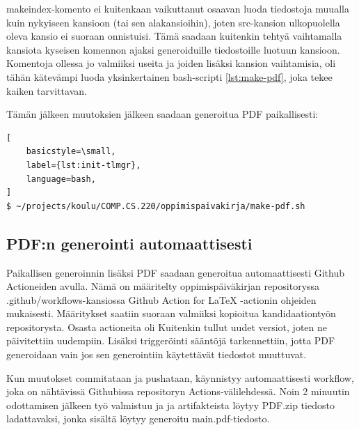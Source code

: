 makeindex-komento ei kuitenkaan vaikuttanut osaavan luoda tiedostoja muualla
kuin nykyiseen kansioon (tai sen alakansioihin), joten src-kansion ulkopuolella
oleva kansio ei suoraan onnistuisi. Tämä saadaan kuitenkin tehtyä vaihtamalla
kansiota kyseisen komennon ajaksi generoiduille tiedostoille luotuun kansioon.
Komentoja ollessa jo valmiiksi useita ja joiden lisäksi kansion vaihtamisia,
oli tähän kätevämpi luoda yksinkertainen bash-scripti \ref{lst:make-pdf}, joka
tekee kaiken tarvittavan.



Tämän jälkeen muutoksien jälkeen saadaan generoitua PDF paikallisesti:

\begin{lstlisting}[
    basicstyle=\small,
    label={lst:init-tlmgr},
    language=bash,
]
$ ~/projects/koulu/COMP.CS.220/oppimispaivakirja/make-pdf.sh
\end{lstlisting}

\subsection{PDF:n generointi automaattisesti}

Paikallisen generoinnin lisäksi PDF saadaan generoitua automaattisesti Github
Actioneiden avulla. Nämä on määritelty oppimispäiväkirjan repositoryssa
.github/workflows-kansiossa Github Action for LaTeX -actionin ohjeiden
\parencite{GithubActionsForLaTeX} mukaisesti. Määritykset saatiin suoraan
valmiiksi kopioitua kandidaationtyön repositorysta. Osasta actioneita oli
Kuitenkin tullut uudet versiot, joten ne päivitettiin uudempiin. Lisäksi
triggeröinti sääntöjä tarkennettiin, jotta PDF generoidaan vain jos sen
generointiin käytettävät tiedostot muuttuvat.

Kun muutokset commitataan ja pushataan, käynnistyy automaattisesti workflow,
joka on nähtävissä Githubissa repositoryn Actions-välilehdessä. Noin 2 minuutin
odottamisen jälkeen työ valmistuu ja ja artifakteista löytyy PDF.zip tiedosto
ladattavaksi, jonka sisältä löytyy generoitu main.pdf-tiedosto.
